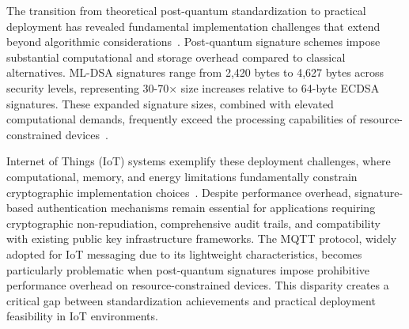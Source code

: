 \documentclass[journal=tches,final]{iacrtrans}
\begin{document}
{\color{blue}The transition from theoretical post-quantum standardization to practical deployment has revealed fundamental implementation challenges that extend beyond algorithmic considerations~\cite{MLDSAHardware2024}. Post-quantum signature schemes impose substantial computational and storage overhead compared to classical alternatives. ML-DSA signatures range from 2,420 bytes to 4,627 bytes across security levels, representing 30-70× size increases relative to 64-byte ECDSA signatures. These expanded signature sizes, combined with elevated computational demands, frequently exceed the processing capabilities of resource-constrained devices~\cite{HwangKim2024}.

Internet of Things (IoT) systems exemplify these deployment challenges, where computational, memory, and energy limitations fundamentally constrain cryptographic implementation choices~\cite{Ghosh2019}. Despite performance overhead, signature-based authentication mechanisms remain essential for applications requiring cryptographic non-repudiation, comprehensive audit trails, and compatibility with existing public key infrastructure frameworks. The MQTT protocol, widely adopted for IoT messaging due to its lightweight characteristics, becomes particularly problematic when post-quantum signatures impose prohibitive performance overhead on resource-constrained devices. This disparity creates a critical gap between standardization achievements and practical deployment feasibility in IoT environments.}
\end{document}
